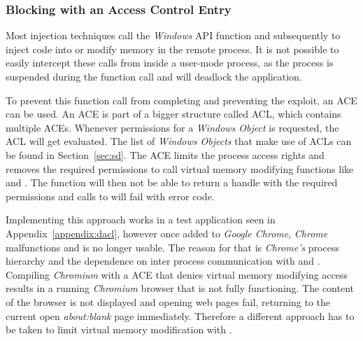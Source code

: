 \subsubsection{Blocking  with an Access Control Entry}
\label{sec:dacl}
Most injection techniques call the \emph{Windows} \gls{API} function  and subsequently  to inject code into or modify memory in the remote process. It is not possible to easily intercept these calls from inside a user-mode process, as the process is suspended during the  function call and will deadlock the application.

\medskip

To prevent this function call from completing and preventing the exploit, an \gls{ACE} can be used. An \gls{ACE} is part of a bigger structure called \gls{ACL}, which contains multiple \glspl{ACE}. Whenever permissions for a \emph{Windows Object} is requested, the \gls{ACL} will get evaluated. The list of \emph{Windows Objects} that make use of \glspl{ACL} can be found in Section~\ref{sec:sd}. The \gls{ACE} limits the process access rights and removes the required permissions to call virtual memory modifying functions like  and . The  function will then not be able to return a handle with the required permissions and calls to  will fail with  error code.

\medskip

Implementing this approach works in a test application seen in Appendix~\ref{appendix:dacl}, however once added to \emph{Google Chrome}, \emph{Chrome} malfunctions and is no longer usable. The reason for that is \emph{Chrome's} process hierarchy and the dependence on inter process communication with  and . Compiling \emph{Chromium} with a \gls{ACE} that denies virtual memory modifying access results in a running \emph{Chromium} browser that is not fully functioning. The content of the browser is not displayed and opening web pages fail, returning to the current open \emph{about:blank} page immediately. Therefore a different approach has to be taken to limit virtual memory modification with .